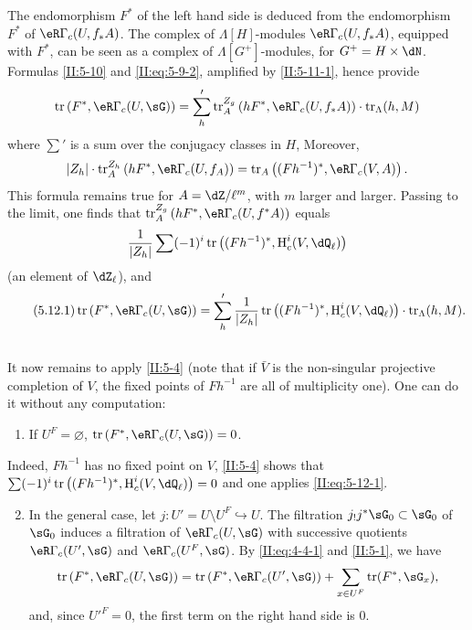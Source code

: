 The endomorphism $F^*$ of the left hand side is deduced from the endomorphism
$F^*$ of $\eR\Gamma_c(U,f_* A)$. The complex of $\Lambda[H]$-modules
$\eR\Gamma_c(U,f_* A)$, equipped with $F^*$, can be seen as a complex of
$\Lambda[G^+]$-modules, for $G^+=H\times \dN$. Formulas \ref{II:5-10}
and \eqref{II:eq:5-9-2}, amplified by \ref{II:5-11-1}, hence provide
\[
  \tr\left(F^*,\eR\Gamma_c(U,\sG)\right) = \sum_h' \tr_A^{Z_g}\left(h F^*,\eR\Gamma_c(U,f_* A)\right)\cdot \tr_\Lambda(h,M)
\]
where $\sum'$ is a sum over the conjugacy classes in $H$, Moreover,
\[
  |Z_h|\cdot \tr_A^{Z_h}\left(h F^*,\eR\Gamma_c(U,f_ A)\right) = \tr_A\left((F h^{-1})^*,\eR\Gamma_c(V,A)\right) \text{.}
\]
This formula remains true for $A=\dZ/\ell^m$, with $m$ larger and larger.
Passing to the limit, one finds that
$\tr_A^{Z_g}\left(h F^*,\eR\Gamma_c(U,f^* A)\right)$ equals
\[
  \frac{1}{|Z_h|} \sum (-1)^i \tr\left((F h^{-1})^*,\h_c^i(V,\dQ_\ell)\right)
\]
(an element of $\dZ_\ell$), and
\begin{equation*}\tag{5.12.1}\label{II:eq:5-12-1}
\tr\left(F^*,\eR\Gamma_c(U,\sG)\right) = \sum_h' \frac{1}{|Z_h|} \tr\left((F h^{-1})^*,\h_c^i(V,\dQ_\ell)\right)\cdot \tr_\Lambda(h,M) \text{.}
\end{equation*}




\subsection{}\label{II:5-13}

It now remains to apply \ref{II:5-4} (note that if $\bar V$ is the
non-singular projective completion of $V$, the fixed points of $F h^{-1}$
are all of multiplicity one). One can do it without any computation:
\begin{enumerate}[\indent A.]
  \item If $U^F=\varnothing$, $\tr\left(F^*,\eR\Gamma_c(U,\sG)\right) = 0$. \end{enumerate}

Indeed, $F h^{-1}$ has no fixed point on $V$, \ref{II:5-4} shows that
$\sum (-1)^i \tr\left((F h^{-1})^*,\h_c^i(V,\dQ_\ell)\right)=0$ and one
applies \eqref{II:eq:5-12-1}.
\begin{enumerate}[\indent A.]
\setcounter{enumi}{1}
  \item In the general case, let $j:U'=U\setminus U^F\hookrightarrow U$.
    The filtration  $j_! j^* \sG_0\subset \sG_0$ of $\sG_0$ induces a
    filtration of $\eR\Gamma_c(U,\sG)$ with successive quotients
    $\eR\Gamma_c(U',\sG)$ and $\eR\Gamma_c(U^F,\sG)$. By \eqref{II:eq:4-4-1}
    and \ref{II:5-1}, we have
    \[
      \tr\left(F^*,\eR\Gamma_c(U,\sG)\right) = \tr\left(F^*,\eR\Gamma_c(U',\sG)\right) + \sum_{x\in U^F} \tr(F^*,\sG_x) \text{,}
    \]
    and, since ${U'}^F=0$, the first term on the right hand side is $0$.
\end{enumerate}











